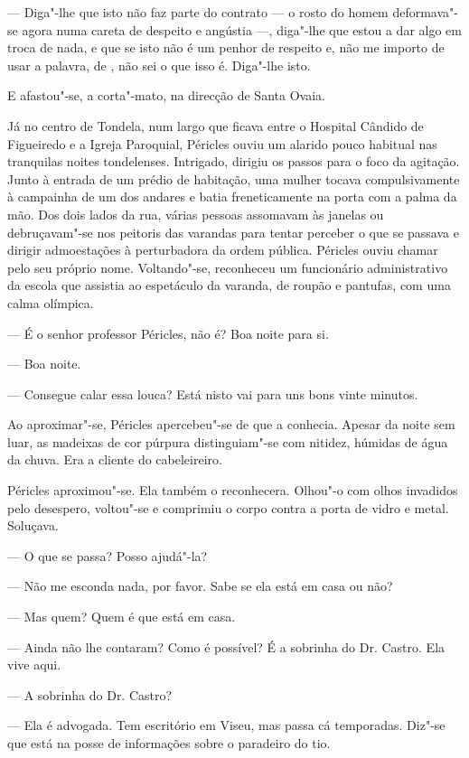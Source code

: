 --- Diga"-lhe que isto não faz parte do contrato --- o rosto do homem
  deformava"-se agora numa careta de despeito e angústia ---, diga"-lhe
  que estou a dar algo em troca de nada, e que se isto não é um penhor
  de respeito e, não me importo de usar a palavra, de , não sei o
  que isso é. Diga"-lhe isto.

E afastou"-se, a corta"-mato, na direcção de Santa Ovaia.

Já no centro de Tondela, num largo que ficava entre o
Hospital Cândido de Figueiredo e a Igreja Paroquial, Péricles ouviu um
alarido pouco habitual nas tranquilas noites tondelenses. Intrigado,
dirigiu os passos para o foco da agitação. Junto à entrada de um prédio
de habitação, uma mulher tocava compulsivamente à campainha de um dos
andares e batia freneticamente na porta com a palma da mão. Dos dois
lados da rua, várias pessoas assomavam às janelas ou debruçavam"-se nos
peitoris das varandas para tentar perceber o que se passava e dirigir
admoestações à perturbadora da ordem pública. Péricles ouviu chamar
pelo seu próprio nome. Voltando"-se, reconheceu um funcionário
administrativo da escola que assistia ao espetáculo da varanda, de
roupão e pantufas, com uma calma olímpica.

--- É o senhor professor Péricles, não é? Boa noite para si.

--- Boa noite.

--- Consegue calar essa louca? Está nisto vai para uns bons vinte minutos.

Ao aproximar"-se, Péricles apercebeu"-se de que a conhecia. Apesar da
noite sem luar, as madeixas de cor púrpura distinguiam"-se
com nitidez, húmidas de água da chuva. Era a cliente do
cabeleireiro.

Péricles aproximou"-se. Ela também o reconhecera. Olhou"-o com olhos invadidos pelo desespero, voltou"-se e comprimiu o corpo
contra a porta de vidro e metal. Soluçava.

--- O que se passa? Posso ajudá"-la?

--- Não me esconda nada, por favor. Sabe se ela está em casa ou não?

--- Mas quem? Quem é que está em casa.

--- Ainda não lhe contaram? Como é possível? É a sobrinha do Dr. Castro.
  Ela vive aqui.

--- A sobrinha do Dr. Castro?

--- Ela é advogada. Tem escritório em Viseu, mas passa cá temporadas.
  Diz"-se que está na posse de informações sobre o paradeiro do tio.


